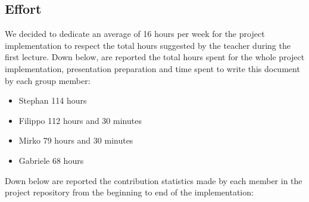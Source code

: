 \subsection{Effort}
We decided to dedicate an average of 16 hours per week for the project implementation to respect the total hours suggested by the teacher during the first lecture.\newline
Down below, are reported the total hours spent for the whole project implementation, presentation preparation and time spent to write this document by each group member:
\begin{itemize}
  \item Stephan 114 hours
  \item Filippo 112 hours and 30 minutes
  \item Mirko 79 hours and 30 minutes
  \item Gabriele 68 hours
\end{itemize}
Down below are reported the contribution statistics made by each member in the project repository from the beginning to end of the implementation:
